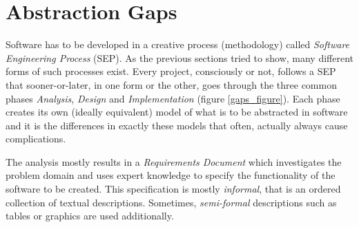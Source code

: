 %
%
%
%
%
%
%

\section{Abstraction Gaps}
\label{abstraction_gaps_heading}

Software has to be developed in a creative process (methodology) called
\emph{Software Engineering Process} (SEP). As the previous sections tried to
show, many different forms of such processes exist. Every project, consciously
or not, follows a SEP that sooner-or-later, in one form or the other, goes through
the three common phases \emph{Analysis}, \emph{Design} and \emph{Implementation}
(figure \ref{gaps_figure}). Each phase creates its own (ideally equivalent)
model of what is to be abstracted in software and it is the differences in
exactly these models that often, actually always cause complications.

The analysis mostly results in a \emph{Requirements Document} which investigates
the problem domain and uses expert knowledge to specify the functionality of
the software to be created. This specification is mostly \emph{informal}, that
is an ordered collection of textual descriptions. Sometimes, \emph{semi-formal}
descriptions such as tables or graphics are used additionally.

